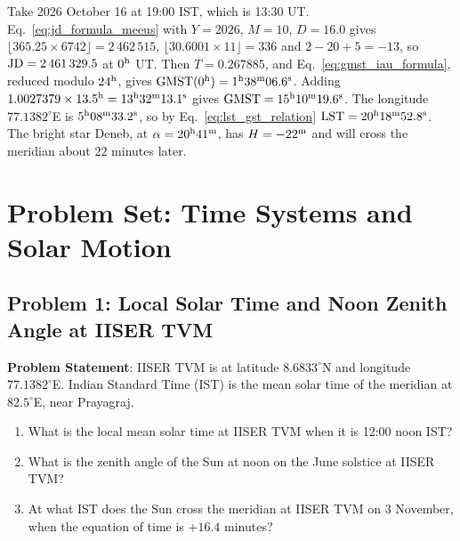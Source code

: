 \begin{example}
	Take 2026 October 16 at 19:00 IST, which is 13:30 UT. Eq.~\eqref{eq:jd_formula_meeus} with $Y=2026$, $M=10$, $D=16.0$ gives $\lfloor365.25\times6742\rfloor=2\,462\,515$, $\lfloor30.6001\times11\rfloor=336$ and $2-20+5=-13$, so $\mathrm{JD}=2\,461\,329.5$ at $0^{\rm h}$ UT. Then $T=0.267885$, and Eq.~\eqref{eq:gmst_iau_formula}, reduced modulo $24^{\rm h}$, gives $\mathrm{GMST}(0^{\rm h})=1^{\rm h}38^{\rm m}06.6^{\rm s}$. Adding $1.0027379\times13.5^{\rm h}=13^{\rm h}32^{\rm m}13.1^{\rm s}$ gives $\mathrm{GMST}=15^{\rm h}10^{\rm m}19.6^{\rm s}$. The longitude $77.1382^\circ$E is $5^{\rm h}08^{\rm m}33.2^{\rm s}$, so by Eq.~\eqref{eq:lst_gst_relation} $\mathrm{LST}=20^{\rm h}18^{\rm m}52.8^{\rm s}$. The bright star Deneb, at $\alpha=20^{\rm h}41^{\rm m}$, has $H=-22^{\rm m}$ and will cross the meridian about $22$ minutes later.
\end{example}

\section{Problem Set: Time Systems and Solar Motion}

\subsection{Problem 1: Local Solar Time and Noon Zenith Angle at IISER TVM}
\label{ti:prob:tvm}

\textbf{Problem Statement}: IISER TVM is at latitude $8.6833^\circ$N and longitude $77.1382^\circ$E. Indian Standard Time (IST) is the mean solar time of the meridian at $82.5^\circ$E, near Prayagraj.
\begin{enumerate}[label=(\alph*)]
	\item What is the local mean solar time at IISER TVM when it is 12:00 noon IST?
	\item What is the zenith angle of the Sun at noon on the June solstice at IISER TVM?
	\item At what IST does the Sun cross the meridian at IISER TVM on 3 November, when the equation of time is $+16.4$ minutes?
\end{enumerate}

